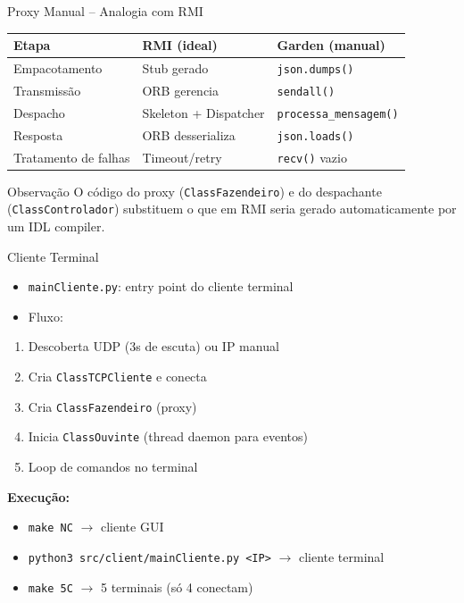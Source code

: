 \documentclass[aspectratio=169]{beamer}
\begin{document}
\begin{frame}{Proxy Manual -- Analogia com RMI}
  \footnotesize
  \begin{tabular}{>{\raggedright\arraybackslash}p{3cm}>{\raggedright\arraybackslash}p{4.5cm}>{\raggedright\arraybackslash}p{4.5cm}}
    \toprule
    \textbf{Etapa} & \textbf{RMI (ideal)} & \textbf{Garden (manual)} \\
    \midrule
    Empacotamento & Stub gerado & \texttt{json.dumps()} \\
    Transmiss\~ao & ORB gerencia & \texttt{sendall()} \\
    Despacho & Skeleton + Dispatcher & \texttt{processa\_mensagem()} \\
    Resposta & ORB desserializa & \texttt{json.loads()} \\
    Tratamento de falhas & Timeout/retry & \texttt{recv()} vazio \\
    \bottomrule
  \end{tabular}
  \vfill
  \begin{block}{Observa\c{c}\~ao}
    O c\'odigo do proxy (\texttt{ClassFazendeiro}) e do despachante (\texttt{ClassControlador}) substituem o que em RMI seria gerado automaticamente por um IDL compiler.
  \end{block}
\end{frame}

\begin{frame}{Cliente Terminal}
  \begin{itemize}
    \item \texttt{mainCliente.py}: entry point do cliente terminal
    \item Fluxo:
  \end{itemize}
  \begin{enumerate}
    \item Descoberta UDP (3s de escuta) ou IP manual
    \item Cria \texttt{ClassTCPCliente} e conecta
    \item Cria \texttt{ClassFazendeiro} (proxy)
    \item Inicia \texttt{ClassOuvinte} (thread daemon para eventos)
    \item Loop de comandos no terminal
  \end{enumerate}
  \vfill
  \textbf{Execu\c{c}\~ao:}
  \begin{itemize}
    \item \texttt{make NC} $\rightarrow$ cliente GUI
    \item \texttt{python3 src/client/mainCliente.py <IP>} $\rightarrow$ cliente terminal
    \item \texttt{make 5C} $\rightarrow$ 5 terminais (s\'o 4 conectam)
  \end{itemize}
\end{frame}
\end{document}
